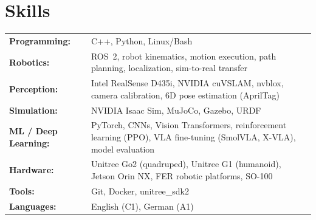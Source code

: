 \documentclass[A4,10.5pt]{article}
\newcommand{\CVSubHeadingListStart}{\begin{itemize}[leftmargin=0.5cm, label={}]}
\newcommand{\CVSubHeadingListEnd}{\end{itemize}}
\begin{document}
\section*{Skills}
\begin{tabular}{p{} p{}}
\textbf{Programming:} & C++, Python, Linux/Bash \\
\textbf{Robotics:} & ROS~2, robot kinematics, motion execution, path planning, localization, sim-to-real transfer \\
\textbf{Perception:} & Intel RealSense D435i, NVIDIA cuVSLAM, nvblox, camera calibration, 6D pose estimation (AprilTag) \\
\textbf{Simulation:} & NVIDIA Isaac Sim, MuJoCo, Gazebo, URDF \\
\textbf{ML / Deep Learning:} & PyTorch, CNNs, Vision Transformers, reinforcement learning (PPO), VLA fine-tuning (SmolVLA, X-VLA), model evaluation \\
\textbf{Hardware:} & Unitree Go2 (quadruped), Unitree G1 (humanoid), Jetson Orin NX, FER robotic platforms, SO-100 \\
\textbf{Tools:} & Git, Docker, unitree\_sdk2 \\
\textbf{Languages:} & English (C1), German (A1)
\end{tabular}




\end{document}
